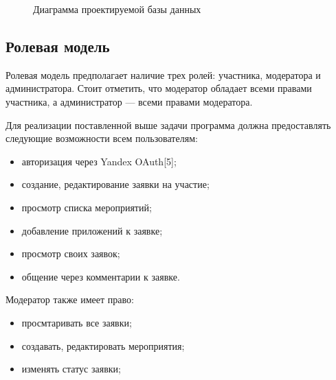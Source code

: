 \begin{figure}[h!]
	\caption{Диаграмма проектируемой базы данных}
	\label{fig:er-2}
\end{figure}

\subsection{Ролевая модель}

Ролевая модель предполагает наличие трех ролей: участника, модератора и администратора. Стоит отметить, что модератор обладает всеми правами участника, а администратор --- всеми правами модератора.

Для реализации поставленной выше задачи программа должна предоставлять следующие возможности всем пользователям:
\begin{itemize}[label=---]
	\item авторизация через Yandex OAuth[5];
	\item создание, редактирование заявки на участие;
	\item просмотр списка мероприятий;
	\item добавление приложений к заявке;
	\item просмотр своих заявок;
	\item общение через комментарии к заявке.
\end{itemize}

Модератор также имеет право:
\begin{itemize}[label=---]
	\item просмтаривать все заявки;
	\item создавать, редактировать мероприятия;
	\item изменять статус заявки;
\end{itemize}


